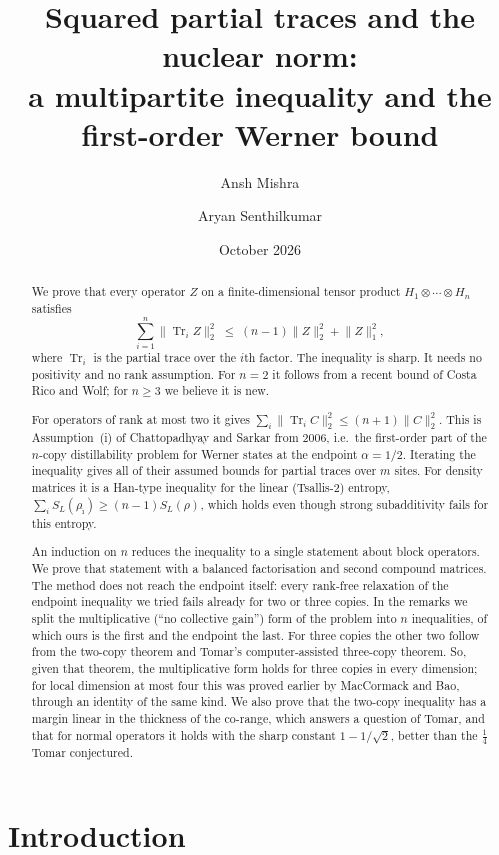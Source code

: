 \documentclass[11pt]{article}
\title{Squared partial traces and the nuclear norm:\\ a multipartite inequality and the first-order Werner bound}
\author{Ansh Mishra \and Aryan Senthilkumar}
\date{October 2026}
\theoremstyle{remark}
\newcommand{\Tr}{\operatorname{Tr}}
\newcommand{\norm}[1]{\lVert #1\rVert}
\begin{document}
\maketitle

\begin{abstract}
We prove that every operator $Z$ on a finite-dimensional tensor product $H_1\otimes\cdots\otimes H_n$ satisfies
\[
\sum_{i=1}^n \norm{\Tr_i Z}_2^2\;\le\;(n-1)\norm{Z}_2^2+\norm{Z}_1^2 ,
\]
where $\Tr_i$ is the partial trace over the $i$th factor. The inequality is sharp. It needs no positivity and no rank
assumption. For $n=2$ it follows from a recent bound of Costa Rico and Wolf; for $n\ge3$ we believe it is new.

For operators of rank at most two it gives $\sum_i\norm{\Tr_iC}_2^2\le(n+1)\norm{C}_2^2$. This is Assumption~(i) of
Chattopadhyay and Sarkar from 2006, i.e.\ the first-order part of the $n$-copy distillability problem for Werner
states at the endpoint $\alpha=1/2$. Iterating the inequality gives all of their assumed bounds for partial traces over
$m$ sites. For density matrices it is a Han-type inequality for the linear (Tsallis-2) entropy,
$\sum_i S_L(\rho_{\hat\imath})\ge(n-1)S_L(\rho)$, which holds even though strong subadditivity fails for this entropy.

An induction on $n$ reduces the inequality to a single statement about block operators. We prove that statement with
a balanced factorisation and second compound matrices. The method does not reach the endpoint itself: every rank-free
relaxation of the endpoint inequality we tried fails already for two or three copies. In the remarks we split the
multiplicative (``no collective gain'') form of the problem into $n$ inequalities, of which ours is the first and the
endpoint the last. For three copies the other two follow from the two-copy theorem and Tomar's computer-assisted
three-copy theorem. So, given that theorem, the multiplicative form holds for three copies in every dimension; for local dimension at most four this was proved earlier by MacCormack and Bao, through an identity of the same kind. We also prove that the
two-copy inequality has a margin linear in the thickness of the co-range, which answers a question of Tomar, and that
for normal operators it holds with the sharp constant $1-1/\sqrt2$, better than the $\frac14$ Tomar conjectured.
\end{abstract}

\section{Introduction}
\end{document}

